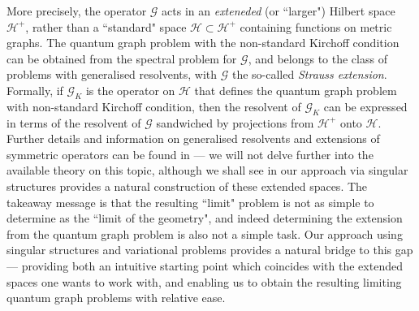More precisely, the operator $\mathcal{G}$ acts in an \emph{exteneded} (or ``larger") Hilbert space $\mathcal{H}^+$, rather than a ``standard" space $\mathcal{H}\subset\mathcal{H}^+$ containing functions on metric graphs.
The quantum graph problem with the non-standard Kirchoff condition can be obtained from the spectral problem for $\mathcal{G}$, and belongs to the class of problems with generalised resolvents, with $\mathcal{G}$ the so-called \emph{Strauss extension}.
Formally, if $\mathcal{G}_K$ is the operator on $\mathcal{H}$ that defines the quantum graph problem with non-standard Kirchoff condition, then the resolvent of $\mathcal{G}_K$ can be expressed in terms of the resolvent of $\mathcal{G}$ sandwiched by projections from $\mathcal{H}^+$ onto $\mathcal{H}$.
Further details and information on generalised resolvents and extensions of symmetric operators can be found in \cite{strauss1999function} --- we will not delve further into the available theory on this topic, although we shall see in  our approach via singular structures provides a natural construction of these extended spaces.
The takeaway message is that the resulting ``limit" problem is not as simple to determine as the ``limit of the geometry", and indeed determining the extension from the quantum graph problem is also not a simple task.
Our approach using singular structures and variational problems provides a natural bridge to this gap --- providing both an intuitive starting point which coincides with the extended spaces one wants to work with, and enabling us to obtain the resulting limiting quantum graph problems with relative ease.

